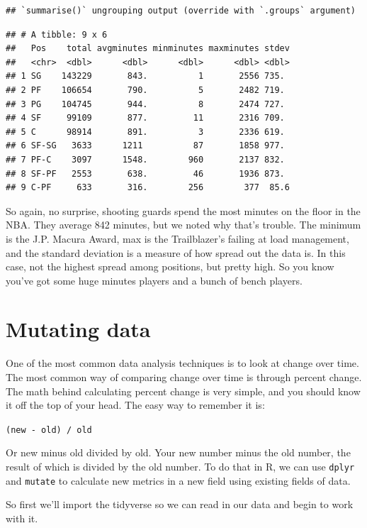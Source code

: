 \documentclass[
]{book}
\begin{document}
\begin{verbatim}
## `summarise()` ungrouping output (override with `.groups` argument)
\end{verbatim}

\begin{verbatim}
## # A tibble: 9 x 6
##   Pos    total avgminutes minminutes maxminutes stdev
##   <chr>  <dbl>      <dbl>      <dbl>      <dbl> <dbl>
## 1 SG    143229       843.          1       2556 735. 
## 2 PF    106654       790.          5       2482 719. 
## 3 PG    104745       944.          8       2474 727. 
## 4 SF     99109       877.         11       2316 709. 
## 5 C      98914       891.          3       2336 619. 
## 6 SF-SG   3633      1211          87       1858 977. 
## 7 PF-C    3097      1548.        960       2137 832. 
## 8 SF-PF   2553       638.         46       1936 873. 
## 9 C-PF     633       316.        256        377  85.6
\end{verbatim}

So again, no surprise, shooting guards spend the most minutes on the floor in the NBA. They average 842 minutes, but we noted why that's trouble. The minimum is the J.P. Macura Award, max is the Trailblazer's failing at load management, and the standard deviation is a measure of how spread out the data is. In this case, not the highest spread among positions, but pretty high. So you know you've got some huge minutes players and a bunch of bench players.

\hypertarget{mutating-data}{%
\chapter{Mutating data}\label{mutating-data}}

One of the most common data analysis techniques is to look at change over time. The most common way of comparing change over time is through percent change. The math behind calculating percent change is very simple, and you should know it off the top of your head. The easy way to remember it is:

\texttt{(new\ -\ old)\ /\ old}

Or new minus old divided by old. Your new number minus the old number, the result of which is divided by the old number. To do that in R, we can use \texttt{dplyr} and \texttt{mutate} to calculate new metrics in a new field using existing fields of data.

So first we'll import the tidyverse so we can read in our data and begin to work with it.
\end{document}
